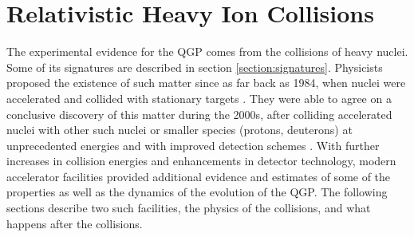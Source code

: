 \chapter{Relativistic Heavy Ion Collisions}\label{ch:RHI-collisions}
The experimental evidence for the QGP comes from the collisions of heavy nuclei. Some of its signatures are described in section \ref{section:signatures}. Physicists proposed the existence of such matter since as far back as 1984, when nuclei were accelerated and collided with stationary targets \cite{Gyulassy:2004vg}. They were able to agree on a conclusive discovery of this matter during the 2000s, after colliding accelerated nuclei with other such nuclei or smaller species (protons, deuterons) at unprecedented energies and with improved detection schemes \cite{Ritter:2004xj}. With further increases in collision energies and enhancements in detector technology, modern accelerator facilities provided additional evidence and estimates of some of the properties as well as the dynamics of the evolution of the QGP. The following sections describe two such facilities, the physics of the collisions, and what happens after the collisions.


